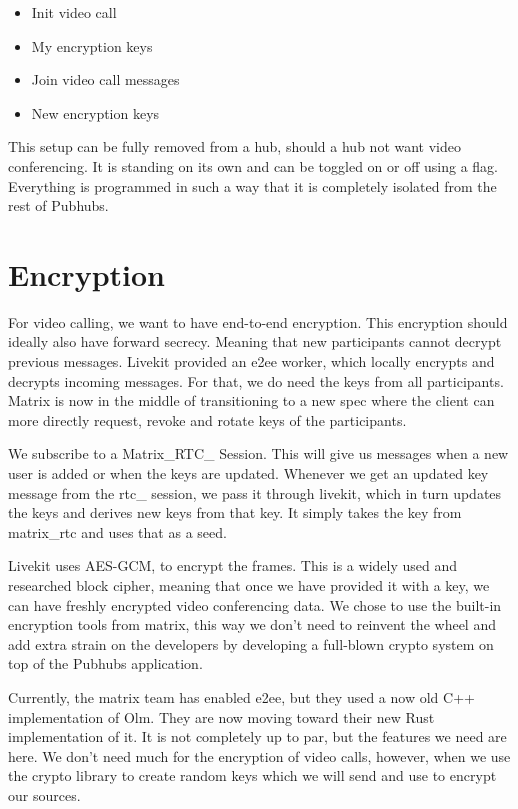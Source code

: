\documentclass{report}
\begin{document}
    \begin{itemize}
        \item Init video call
        \item My encryption keys
        \item Join video call messages
        \item New encryption keys
    \end{itemize}

    This setup can be fully removed from a hub, should a hub not want video conferencing. It is standing on its own and
    can be toggled on or off using a flag. Everything is programmed in such a way that it is completely isolated from
    the rest of Pubhubs.


    \section{Encryption}

    For video calling, we want to have end-to-end encryption. This encryption should ideally also have forward secrecy.
    Meaning that new participants cannot decrypt previous messages. Livekit provided an e2ee worker, which locally
    encrypts and decrypts incoming messages. For that, we do need the keys from all participants. Matrix is now in the
    middle of transitioning to a new spec where the client can more directly request, revoke and rotate keys of the
    participants.

    We subscribe to a Matrix\_RTC\_
    Session. This will give us messages when a new user is added or when the keys are updated. Whenever we get an
    updated key message from the rtc\_
    session, we pass it through livekit, which in turn updates the keys and derives new keys from that key. It simply
    takes the key from matrix\_rtc and uses that as a seed.

    Livekit uses AES-GCM, to encrypt the frames. This is a widely used and researched block cipher, meaning that once we
    have provided it with a key, we can have freshly encrypted video conferencing data. We chose to use the built-in
    encryption tools from matrix, this way we don't need to reinvent the wheel and add extra strain on the developers by
    developing a full-blown crypto system on top of the Pubhubs application.

    Currently, the matrix team has enabled e2ee, but they used a now old C++ implementation of Olm. They are now moving
    toward their new Rust implementation of it. It is not completely up to par, but the features we need are here. We
    don't need much for the encryption of video calls, however, when we use the crypto library to create random keys
    which we will send and use to encrypt our sources.
\end{document}
